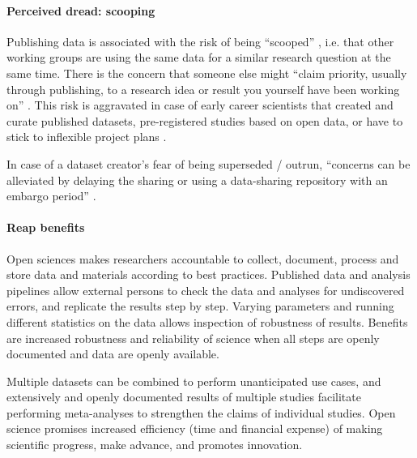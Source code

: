 

\paragraph{Perceived dread: scooping}


%
Publishing data is associated with the risk of being ``scooped''
\citep[cf.][]{laine2017afraid}, i.e. that other working groups are using the
same data for a similar research question at the same time.
%
There is the concern that someone else might ``claim priority, usually through
publishing, to a research idea or result you yourself have been working on''
\citep{laine2017afraid}.
%
This risk is aggravated in case of early career scientists that created and
curate published datasets, pre-registered studies based on open data, or have to
stick to inflexible project plans \citep[cf.][]{toribio2021early}.

%
In case of a dataset creator's fear of being superseded / outrun, ``concerns can
be alleviated by delaying the sharing or using a data-sharing repository with an
embargo period'' \citep{nichols2017best}.


\paragraph{Reap benefits}

%
Open sciences makes researchers accountable to collect, document, process and
store data and materials according to best practices.
%
Published data and analysis pipelines allow external persons to check the data
and analyses for undiscovered errors, and replicate the results step by step.
%
Varying parameters and running different statistics on the data allows
inspection of robustness of results.
%
Benefits are increased robustness and reliability of science when all steps are
openly documented and data are openly available.

%
Multiple datasets can be combined to perform unanticipated use cases, and
extensively and openly documented results of multiple studies facilitate
performing meta-analyses to strengthen the claims of individual studies.
%
Open science promises increased efficiency (time and financial expense) of
making scientific progress, make advance, and promotes innovation.

